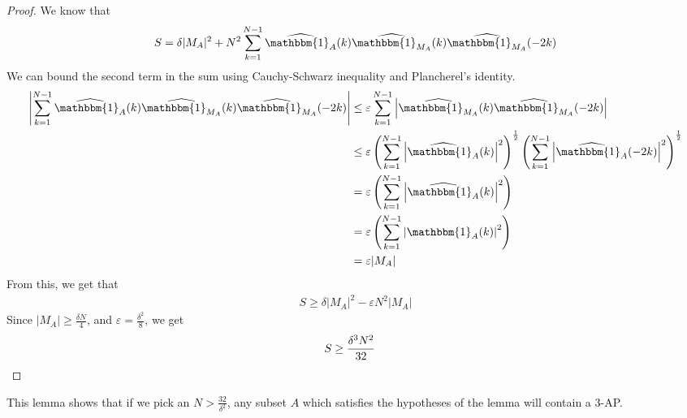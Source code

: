 \documentclass[12pt]{article}
\theoremstyle{definition}
\newcommand{\vep}{\varepsilon}
\newcommand{\indi}{\mathbbm{1}}
\begin{document}
\begin{proof}
    We know that
    \begin{align*}
        S = \delta |M_A|^2 + N^2 \sum_{k=1}^{N-1} \widehat{\indi_A}(k) \widehat{\indi_{M_A}}(k) \widehat{\indi_{M_A}}(-2k)
    \end{align*}
    We can bound the second term in the sum using Cauchy-Schwarz inequality and Plancherel's identity.
    \begin{align*}
        \left| \sum_{k=1}^{N-1} \widehat{\indi_A}(k) \widehat{\indi_{M_A}}(k) \widehat{\indi_{M_A}}(-2k) \right|
        &\leq \vep \sum_{k=1}^{N-1}\left| \widehat{\indi_{M_A}}(k) \widehat{\indi_{M_A}}(-2k) \right| \\
        &\leq \vep \left( \sum_{k=1}^{N-1} \left| \widehat{\indi_A}(k) \right|^2 \right)^{\frac{1}{2}} \left( \sum_{k=1}^{N-1} \left| \widehat{\indi_A}(-2k) \right|^2 \right)^{\frac{1}{2}} \\
        &= \vep \left( \sum_{k=1}^{N-1} \left| \widehat{\indi_A}(k) \right|^2 \right) \\
        &= \vep \left( \sum_{k=1}^{N-1} \left| \indi_A(k) \right|^2 \right) \\
        &= \vep |M_A|
    \end{align*}
    From this, we get that
    \begin{align*}
        S \geq \delta |M_A|^2 - \vep N^2 |M_A|
    \end{align*}
    Since $|M_A| \geq \frac{\delta N}{4}$, and $\vep = \frac{\delta^2}{8}$, we get
    \begin{align*}
        S \geq \frac{\delta^3 N^2}{32} &\qedhere
    \end{align*}
\end{proof}
This lemma shows that if we pick an $N > \frac{32}{\delta^2}$, any subset $A$ which satisfies the hypotheses of the lemma will contain a $3$-AP.
\end{document}
